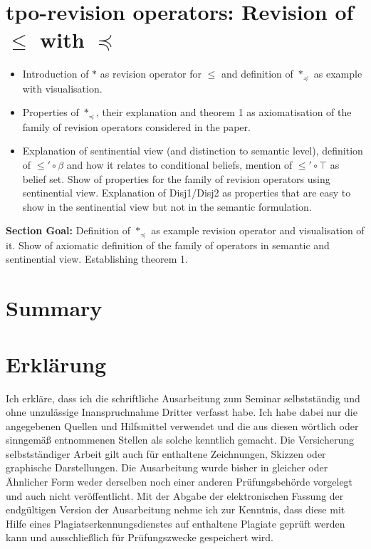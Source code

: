 \documentclass[11pt]{scrartcl}
\begin{document}
\section{tpo-revision operators: Revision of $\leq$ with $\preceq$}
\begin{itemize}
    \item Introduction of $\ast$ as revision operator for $\leq$ and definition of $\ast_{\preceq}$ as example with visualisation.
    \item Properties of $\ast_{\preceq}$, their explanation and theorem 1 as axiomatisation of the family of revision operators considered in the paper.
    \item Explanation of sentinential view (and distinction to semantic level), definition of $\leq' \circ \beta $ and how it relates to conditional beliefs, mention of $\leq' \circ \top $ as belief set. Show of properties for the family of revision operators using sentinential view. Explanation of Disj1/Disj2 as properties that are easy to show in the sentinential view but not in the semantic formulation.
\end{itemize}
\textbf{Section Goal:} Definition of $\ast_{\preceq}$ as example revision operator and visualisation of it. Show of axiomatic definition of the family of operators in semantic and sentinential view. Establishing theorem 1.

\section{Summary}

\newpage

\typeout{}



\newpage

\section*{Erklärung}
Ich erkläre, dass ich die schriftliche Ausarbeitung zum Seminar selbstständig und ohne unzulässige Inanspruchnahme Dritter verfasst habe. Ich habe dabei nur die angegebenen Quellen und Hilfsmittel verwendet und die aus diesen wörtlich oder sinngemäß entnommenen Stellen als solche kenntlich gemacht. Die Versicherung selbstständiger Arbeit gilt auch für enthaltene Zeichnungen, Skizzen oder graphische Darstellungen. Die Ausarbeitung wurde bisher in gleicher oder Ähnlicher Form weder derselben noch einer anderen Prüfungsbehörde vorgelegt und auch nicht veröffentlicht. Mit der Abgabe der elektronischen Fassung der endgültigen Version der Ausarbeitung nehme ich zur Kenntnis, dass diese mit Hilfe eines Plagiatserkennungsdienstes auf enthaltene Plagiate geprüft werden kann und ausschließlich für Prüfungszwecke gespeichert wird.
\end{document}
